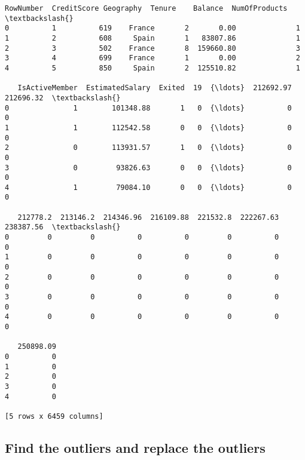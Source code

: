 \documentclass[11pt]{article}
\makeatletter
\newcommand{\boxspacing}{\kern\kvtcb@left@rule\kern\kvtcb@boxsep}
\newcommand{\prompt}[4]{
        {\ttfamily\llap{{\color{#2}[#3]:\hspace{3pt}#4}}\vspace{-\baselineskip}}
    }
\makeatother
\begin{document}
            \begin{tcolorbox}[breakable, size=fbox, boxrule=.5pt, pad at break*=1mm, opacityfill=0]
\prompt{Out}{outcolor}{61}{\boxspacing}
\begin{Verbatim}[commandchars=\\\{\}]
   RowNumber  CreditScore Geography  Tenure    Balance  NumOfProducts  \textbackslash{}
0          1          619    France       2       0.00              1
1          2          608     Spain       1   83807.86              1
2          3          502    France       8  159660.80              3
3          4          699    France       1       0.00              2
4          5          850     Spain       2  125510.82              1

   IsActiveMember  EstimatedSalary  Exited  19  {\ldots}  212692.97  212696.32  \textbackslash{}
0               1        101348.88       1   0  {\ldots}          0          0
1               1        112542.58       0   0  {\ldots}          0          0
2               0        113931.57       1   0  {\ldots}          0          0
3               0         93826.63       0   0  {\ldots}          0          0
4               1         79084.10       0   0  {\ldots}          0          0

   212778.2  213146.2  214346.96  216109.88  221532.8  222267.63  238387.56  \textbackslash{}
0         0         0          0          0         0          0          0
1         0         0          0          0         0          0          0
2         0         0          0          0         0          0          0
3         0         0          0          0         0          0          0
4         0         0          0          0         0          0          0

   250898.09
0          0
1          0
2          0
3          0
4          0

[5 rows x 6459 columns]
\end{Verbatim}
\end{tcolorbox}
        
    \hypertarget{find-the-outliers-and-replace-the-outliers}{%
\subsection{Find the outliers and replace the
outliers}\label{find-the-outliers-and-replace-the-outliers}}
\end{document}
